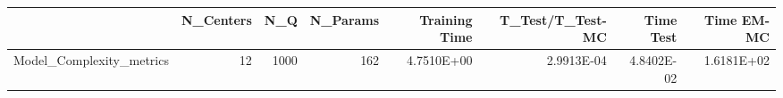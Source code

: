 \begin{tabular}{lrrrrrrr}
\toprule
{} &  N\_Centers &   N\_Q &  N\_Params &  Training Time &  T\_Test/T\_Test-MC &  Time Test &  Time EM-MC \\
\midrule
Model\_Complexity\_metrics &         12 &  1000 &       162 &     4.7510E+00 &        2.9913E-04 & 4.8402E-02 &  1.6181E+02 \\
\bottomrule
\end{tabular}
